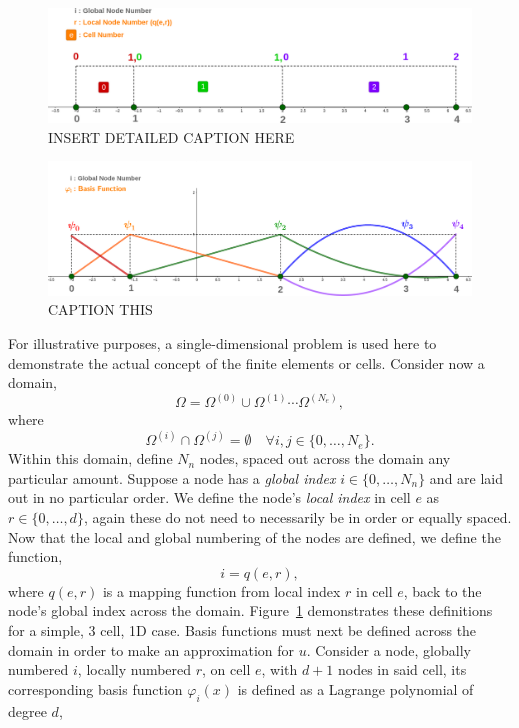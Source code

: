 \begin{figure}
	\centering
	\includegraphics[width=0.8\linewidth]{Figures/node_numbers}
	\caption{INSERT DETAILED CAPTION HERE}
	\label{fig:cells}
\end{figure}
\begin{figure}
	\centering
	\includegraphics[width=0.8\linewidth]{Figures/basis_funcs}
	\caption{CAPTION THIS}
	\label{fig:1dbasis}
\end{figure}
For illustrative purposes, a single-dimensional problem is used here to demonstrate the actual concept of the finite elements or cells. Consider now a domain,
\begin{equation}
	\Omega = \Omega^{(0)}\cup\Omega^{(1)}\cdots\Omega^{(N_e)},
\end{equation}
where 
\begin{equation}
	\Omega^{(i)}\cap\Omega^{(j)} = \emptyset \quad \forall i,j \in \{0,\dots,N_e\}.
\end{equation}
Within this domain, define $N_n$ nodes, spaced out across the domain any particular amount. Suppose a node has a \textit{global index} $i \in \{0,\dots,N_n\}$ and are laid out in no particular order. We define the node's \textit{local index} in cell $e$ as $r \in \{0,\dots,d\}$, again these do not need to necessarily be in order or equally spaced. Now that the local and global numbering of the nodes are defined, we define the function,
\begin{equation}\label{dof}
	i = q(e,r),
\end{equation}
where $q(e,r)$ is a mapping function from local index $r$ in cell $e$, back to the node's global index across the domain. Figure~\ref{fig:cells} demonstrates these definitions for a simple, 3 cell, 1D case. Basis functions must next be defined across the domain in order to make an approximation for $u$. Consider a node, globally numbered $i$, locally numbered $r$, on cell $e$, with $d+1$ nodes in said cell, its corresponding basis function $\varphi_i(x)$ is defined as a Lagrange polynomial of degree $d$,
